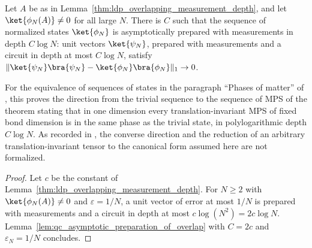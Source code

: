 \begin{lemma}
    \label{thm:ldp_qccc_classification_forward}
    \leanok
    Let $A$ be as in Lemma~\ref{thm:ldp_overlapping_measurement_depth}, and
    let $\ket{\phi_N(A)}\neq0$ for all large $N$. There is $C$ such that the
    sequence of normalized states $\ket{\phi_N}$ is asymptotically prepared
    with measurements in depth $C\log N$: unit vectors $\ket{\psi_N}$,
    prepared with measurements and a circuit in depth at most $C\log N$,
    satisfy
    $\lVert\ket{\psi_N}\bra{\psi_N}-\ket{\phi_N}\bra{\phi_N}\rVert_1\to0$.

    For the equivalence of sequences of states in the paragraph ``Phases of
    matter'' of \cite{Piroli2021LOCC}, this proves the direction from the
    trivial sequence to the sequence of MPS of the theorem stating that in one
    dimension every translation-invariant MPS of fixed bond dimension is in the
    same phase as the trivial state, in polylogarithmic depth $C\log N$.
    As recorded in \cite{gap:psc21_mps_classification_scope}, the converse
    direction and the reduction of an arbitrary translation-invariant tensor to
    the canonical form assumed here are not formalized.
\end{lemma}
\begin{proof}
    \leanok
    Let $c$ be the constant of
    Lemma~\ref{thm:ldp_overlapping_measurement_depth}. For $N\geq2$ with
    $\ket{\phi_N(A)}\neq0$ and $\varepsilon=1/N$, a unit vector of error at
    most $1/N$ is prepared with measurements and a circuit in depth at most
    $c\log(N^2)=2c\log N$. Lemma~\ref{lem:qc_asymptotic_preparation_of_overlap}
    with $C=2c$ and $\varepsilon_N=1/N$ concludes.
\end{proof}
